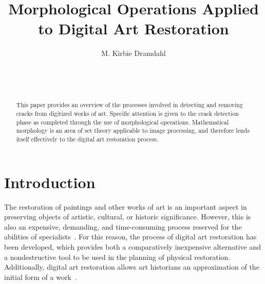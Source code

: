 \documentclass{sig-alternate}
\begin{document}

\title{Morphological Operations Applied to Digital Art Restoration}


\author{
\alignauthor
M. Kirbie Dramdahl\\
	\\
	\\
	\\
}

\maketitle
\begin{abstract}
This paper provides an overview of the processes involved in detecting and removing cracks from digitized works of art. Specific attention is given to the crack detection phase as completed through the use of morphological operations. Mathematical morphology is an area of set theory applicable to image processing, and therefore lends itself effectively to the digital art restoration process.
\end{abstract}




\section{Introduction}\label{introduction}
The restoration of paintings and other works of art is an important aspect in preserving objects of artistic, cultural, or historic significance. However, this is also an expensive, demanding, and time-consuming process reserved for the abilities of specialists~\cite{Theran:2013}. For this reason, the process of digital art restoration has been developed, which provides both a comparatively inexpensive alternative and a nondestructive tool to be used in the planning of physical restoration. Additionally, digital art restoration allows art historians an approximation of the initial form of a work~\cite{TopHat:2010}.
\end{document}

